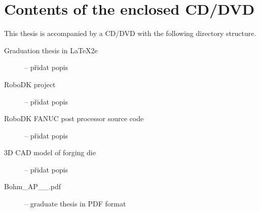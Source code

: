 ﻿\chapter{Contents of the enclosed CD/DVD \label{ch:ApendRoubal}}

This thesis is accompanied by a CD/DVD with the following directory structure.

\begin{description}

    \item[Graduation thesis in \LaTeX2e] -- přidat popis 
            
    \item[RoboDK project] -- přidat popis 

    \item[RoboDK FANUC post processor source code] -- přidat popis 

    \item[3D CAD model of forging die] -- přidat popis 

    \item[Bohm\_AP\_\the\value{YearOld}\_\Year.pdf] -- graduate thesis in PDF format

\end{description}

